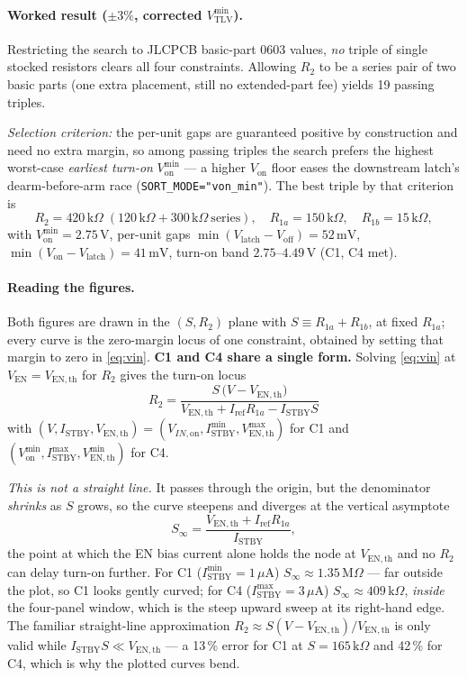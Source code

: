 \documentclass[11pt]{article}
\newcommand{\volt}{\mathrm{V}}\newcommand{\ampere}{\mathrm{A}}
\newcommand{\ohm}{\Omega}
\newcommand{\kilo}{\mathrm{k}}\newcommand{\milli}{\mathrm{m}}
\newcommand{\micro}{\mu}\newcommand{\nano}{\mathrm{n}}
\newcommand{\SI}[2]{\ensuremath{#1\,#2}}
\newcommand{\SIrange}[3]{\ensuremath{#1\text{--}#2\,#3}}
\newcommand{\Ven}{V_{\mathrm{EN}}}
\newcommand{\Vtlv}{V_{\mathrm{TLV}}}
\newcommand{\Vth}{V_{\mathrm{EN,th}}}
\newcommand{\Iref}{I_{\mathrm{ref}}}
\newcommand{\Istby}{I_{\mathrm{STBY}}}
\newcommand{\Rone}{R_{1a}}
\newcommand{\Rtwo}{R_{1b}}
\newcommand{\Rt}{R_{2}}
\newcommand{\Von}{V_{\mathrm{on}}}
\newcommand{\Voff}{V_{\mathrm{off}}}
\newcommand{\Vlatch}{V_{\mathrm{latch}}}
\begin{document}
\paragraph{Worked result ($\pm3\%$, corrected $\Vtlv^{\min}$).}
Restricting the search to JLCPCB basic-part 0603 values, \emph{no} triple of
single stocked resistors clears all four constraints. Allowing $\Rt$ to be a
series pair of two basic parts (one extra placement, still no extended-part
fee) yields 19 passing triples.

\emph{Selection criterion:} the per-unit gaps are guaranteed positive by
construction and need no extra margin, so among passing triples the search
prefers the highest worst-case \emph{earliest turn-on} $\Von^{\min}$ --- a
higher $\Von$ floor eases the downstream latch's dearm-before-arm race
(\texttt{SORT\_MODE="von\_min"}). The best triple by that criterion is
\[
\Rt=\SI{420}{\kilo\ohm}\;(\SI{120}{\kilo\ohm}+\SI{300}{\kilo\ohm}\ \text{series}),\quad
\Rone=\SI{150}{\kilo\ohm},\quad \Rtwo=\SI{15}{\kilo\ohm},
\]
with $\Von^{\min}=\SI{2.75}{\volt}$, per-unit gaps
$\min(\Vlatch-\Voff)=\SI{52}{\milli\volt}$,
$\min(\Von-\Vlatch)=\SI{41}{\milli\volt}$, turn-on band
\SIrange{2.75}{4.49}{\volt} (C1, C4 met).

\paragraph{Reading the figures.} Both figures are drawn in the $(S,\Rt)$
plane with $S\equiv\Rone+\Rtwo$, at fixed $\Rone$; every curve is the
zero-margin locus of one constraint, obtained by setting that margin to zero
in \eqref{eq:vin}. \textbf{C1 and C4 share a single form.} Solving
\eqref{eq:vin} at $\Ven=\Vth$ for $\Rt$ gives the turn-on locus
\begin{equation}
\boxed{\;\Rt=\frac{S\,\big(V-\Vth\big)}
{\Vth+\Iref\Rone-\Istby S}\;}
\label{eq:turnon_locus}
\end{equation}
with $(V,\Istby,\Vth)=(V_{IN,\mathrm{on}},\Istby^{\min},\Vth^{\max})$ for C1
and $(\Von^{\min},\Istby^{\max},\Vth^{\min})$ for C4.

\emph{This is not a straight line.} It passes through the origin, but the
denominator \emph{shrinks} as $S$ grows, so the curve steepens and diverges at
the vertical asymptote
\begin{equation}
S_\infty=\frac{\Vth+\Iref\Rone}{\Istby},
\label{eq:asymptote}
\end{equation}
the point at which the EN bias current alone holds the node at $\Vth$ and no
$\Rt$ can delay turn-on further. For C1 ($\Istby^{\min}=\SI{1}{\micro\ampere}$)
$S_\infty\approx\SI{1.35}{\mathrm{M}\ohm}$ --- far outside the plot, so C1
looks gently curved; for C4 ($\Istby^{\max}=\SI{3}{\micro\ampere}$)
$S_\infty\approx\SI{409}{\kilo\ohm}$, \emph{inside} the four-panel window,
which is the steep upward sweep at its right-hand edge. The familiar
straight-line approximation $\Rt\approx S(V-\Vth)/\Vth$ is only valid while
$\Istby S\ll\Vth$ --- a 13\,\% error for C1 at $S=\SI{165}{\kilo\ohm}$ and
42\,\% for C4, which is why the plotted curves bend.
\end{document}
